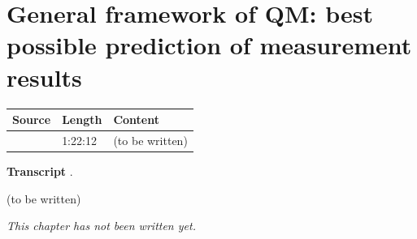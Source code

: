 \chapter{General framework of QM: best possible prediction of measurement results}\label{ch:c10}
\begin{paracol}{2}

\begin{sources}
\begin{tabularx}{\linewidth}{@{}l l L@{}}
\toprule
\textbf{Source} & \textbf{Length} & \textbf{Content}\\
\midrule
{} & 1:22:12 & (to be written)\\
\bottomrule
\end{tabularx}

\smallskip
\textbf{Transcript} .
\end{sources}

\begin{reading}
(to be written)
\end{reading}

\emph{This chapter has not been written yet.}

\flushside
\end{paracol}
